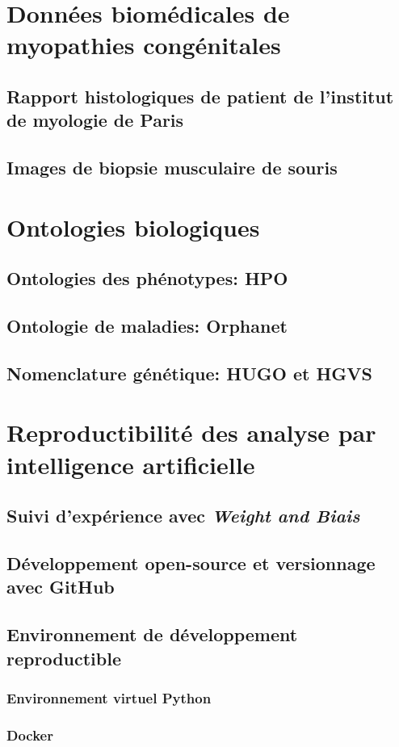 \section{Données biomédicales de myopathies congénitales}
\subsection{Rapport histologiques de patient de l'institut de myologie de Paris}
\subsection{Images de biopsie musculaire de souris}
\section{Ontologies biologiques}
\subsection{Ontologies des phénotypes: HPO}
\subsection{Ontologie de maladies: Orphanet}
\subsection{Nomenclature génétique: HUGO et HGVS}
\section{Reproductibilité des analyse par intelligence artificielle}
\subsection{Suivi d'expérience avec \textit{Weight and Biais}}
\subsection{Développement open-source et versionnage avec GitHub}
\subsection{Environnement de développement reproductible}
\subsubsection{Environnement virtuel Python}
\subsubsection{Docker}
